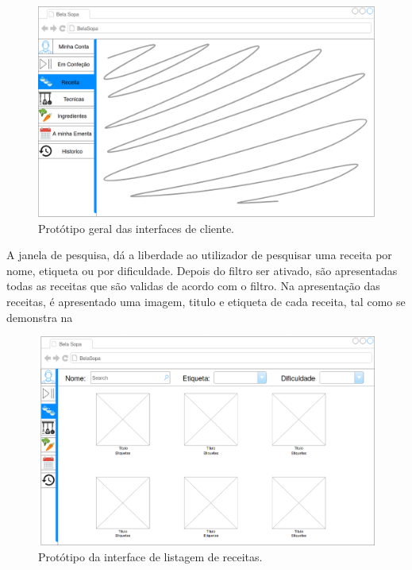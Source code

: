 \begin{figure}[H]
  \centering 
  \includegraphics[width = \textwidth]{figures/07/PaginaInicial.png}
  \caption{Protótipo geral das interfaces de cliente.}
  \label{fig:interface:paginicial}
\end{figure}

A janela de pesquisa, dá a liberdade ao utilizador de pesquisar uma receita por nome, etiqueta ou por dificuldade. Depois do filtro ser ativado, são apresentadas todas as receitas que são validas de acordo com o filtro. Na apresentação das receitas, é apresentado uma imagem, titulo e etiqueta de cada receita, tal como se demonstra na 

\begin{figure}[H]
  \centering 
  \includegraphics[width = \textwidth]{figures/07/Pesquisa.png}
  \caption{Protótipo da interface de listagem de receitas.}
  \label{fig:interface:pesquisa}
\end{figure}

